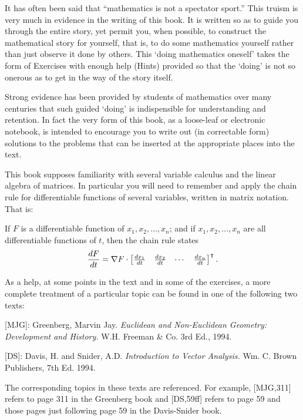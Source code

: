 \documentclass{ximera}
\begin{document}
It has often been said that ``mathematics is not a spectator sport.''
This truism is very much in evidence in the writing of this book. It
is written so as to guide you through the entire story, yet permit
you, when possible, to construct the mathematical story for yourself,
that is, to do some mathematics yourself rather than just observe it
done by others. This `doing mathematics oneself' takes the form of
Exercises with enough help (Hints) provided so that the `doing' is not
so onerous as to get in the way of the story itself.

Strong evidence has been provided by students of mathematics over many
centuries that such guided `doing' is indispensible for understanding and
retention. In fact the very form of this book, as a loose-leaf or electronic
notebook, is intended to encourage you to write out (in correctable form)
solutions to the problems that can be inserted at the appropriate places into
the text.

This book supposes familiarity with several variable calculus and the linear
algebra of matrices. In particular you will need to remember and apply the
chain rule for differentiable functions of several variables, written in
matrix notation. That is:

\begin{theorem}
  If $F$ is a differentiable function of $x_1, x_2,\dots,x_n$; and if
  $x_1, x_2,\dots,x_n$ are all differentiable functions of $t$, then
  the chain rule states
  \[
  \dd[F]{t} = \nabla F \cdot
  \begin{bmatrix}
    \dd[x_1]{t} & \dd[x_2]{t} & \cdots & \dd[x_n]{t}
  \end{bmatrix}^\transpose.
  \]
\end{theorem}

As a help, at some points in the text and in some of the exercises, a more
complete treatment of a particular topic can be found in one of the following
two texts:

[MJG]: Greenberg, Marvin Jay. \textit{Euclidean and Non-Euclidean Geometry:
Development and History.} W.H. Freeman \& Co. 3rd Ed., 1994.

[DS]: Davis, H. and Snider, A.D. \textit{Introduction to Vector Analysis.} Wm.
C. Brown Publishers, 7th Ed. 1994.

The corresponding topics in these texts are referenced. For example, [MJG,311]
refers to page 311 in the Greenberg book and [DS,59ff] refers to page 59 and
those pages just following page 59 in the Davis-Snider book.
\end{document}
